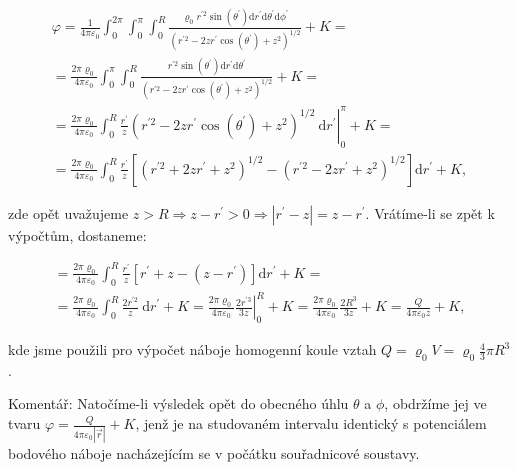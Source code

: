 \documentclass[czech,11pt,a4paper]{article}
\begin{document}
$$
\begin{gathered}
	\varphi=\frac{1}{4 \pi \varepsilon_{0}} \int_{0}^{2 \pi} \int_{0}^{\pi} \int_{0}^{R} \frac{\varrho_{0} r^{\prime 2} \sin \left(\theta^{\prime}\right) \mathrm{d} r^{\prime} \mathrm{d} \theta^{\prime} \mathrm{d} \phi^{\prime}}{\left(r^{\prime 2}-2 z r^{\prime} \cos \left(\theta^{\prime}\right)+z^{2}\right)^{1 / 2}}+K= \\
	=\frac{2 \pi \varrho_{0}}{4 \pi \varepsilon_{0}} \int_{0}^{\pi} \int_{0}^{R} \frac{r^{\prime 2} \sin \left(\theta^{\prime}\right) \mathrm{d} r^{\prime} \mathrm{d} \theta^{\prime}}{\left(r^{\prime 2}-2 z r^{\prime} \cos \left(\theta^{\prime}\right)+z^{2}\right)^{1 / 2}}+K= \\
	=\left.\frac{2 \pi \varrho_{0}}{4 \pi \varepsilon_{0}} \int_{0}^{R} \frac{r^{\prime}}{z}\left(r^{\prime 2}-2 z r^{\prime} \cos \left(\theta^{\prime}\right)+z^{2}\right)^{1 / 2} \mathrm{~d} r^{\prime}\right|_{0} ^{\pi}+K= \\
	=\frac{2 \pi \varrho_{0}}{4 \pi \varepsilon_{0}} \int_{0}^{R} \frac{r^{\prime}}{z}\left[\left(r^{\prime 2}+2 z r^{\prime}+z^{2}\right)^{1 / 2}-\left(r^{\prime 2}-2 z r^{\prime}+z^{2}\right)^{1 / 2}\right] \mathrm{d} r^{\prime}+K,
\end{gathered}
$$

zde opět uvažujeme $z>R \Rightarrow z-r^{\prime}>0 \Rightarrow\left|r^{\prime}-z\right|=z-r^{\prime}$. Vrátíme-li se zpět k výpočtům, dostaneme:

$$
\begin{gathered}
	=\frac{2 \pi \varrho_{0}}{4 \pi \varepsilon_{0}} \int_{0}^{R} \frac{r^{\prime}}{z}\left[r^{\prime}+z-\left(z-r^{\prime}\right)\right] \mathrm{d} r^{\prime}+K= \\
	=\frac{2 \pi \varrho_{0}}{4 \pi \varepsilon_{0}} \int_{0}^{R} \frac{2 r^{\prime 2}}{z} \mathrm{~d} r^{\prime}+K=\left.\frac{2 \pi \varrho_{0}}{4 \pi \varepsilon_{0}} \frac{2 r^{\prime 3}}{3 z}\right|_{0} ^{R}+K=\frac{2 \pi \varrho_{0}}{4 \pi \varepsilon_{0}} \frac{2 R^{3}}{3 z}+K=\frac{Q}{4 \pi \varepsilon_{0} z}+K,
\end{gathered}
$$

kde jsme použili pro výpočet náboje homogenní koule vztah $Q=\varrho_{0} V=\varrho_{0} \frac{4}{3} \pi R^{3}$.

Komentář: Natočíme-li výsledek opět do obecného úhlu $\theta$ a $\phi$, obdržíme jej ve tvaru $\varphi=\frac{Q}{4 \pi \varepsilon_{0}|\vec{r}|}+K$, jenž je na studovaném intervalu identický s potenciálem bodového náboje nacházejícím se v počátku souřadnicové soustavy.
\end{document}
